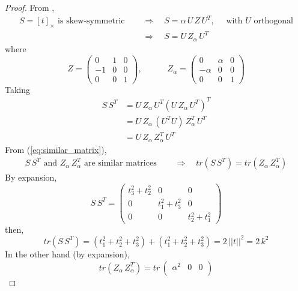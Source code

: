 \begin{proof}
From \cite[Result A4.1 (ii)]{HZ2},
\begin{align*}
S=[t]_{\times} \mbox{ is skew-symmetric } & \quad\Rightarrow\quad S = \alpha\,U\,Z\,U^T, \quad \mbox{ with $U$ orthogonal} \\
        &  \quad\Rightarrow\quad  S = U\,Z_{\alpha}\,U^T
\end{align*}
where
\begin{equation}
Z =
\begin{pmatrix}
  0 & 1  & 0 \\
 -1 &  0  & 0 \\
  0 &  0  & 1
\end{pmatrix}, \quad\quad\quad
Z_{\alpha} =
\begin{pmatrix}
  0 & \alpha  & 0 \\
 -\alpha &  0  & 0 \\
  0 &  0  & 1
\end{pmatrix}
\end{equation}
Taking
\begin{align}
S\,S^T & = U\,Z_{\alpha}\,U^T (U\,Z_{\alpha}\,U^T)^T \nonumber \\
       & = U\,Z_{\alpha}\,(U^T U)\,Z_{\alpha}^T\,U^T \nonumber \\
       & = U\,Z_{\alpha}\,Z_{\alpha}^T\,U^T \label{eq:similar_matrix}
\end{align}
From (\ref{eq:similar_matrix}),
\begin{align}
S\,S^T \mbox{ and } Z_{\alpha}\,Z_{\alpha}^T \mbox{ are similar matrices } & \quad\Rightarrow\quad tr(S\,S^T) = tr(Z_{\alpha}\,Z_{\alpha}^T) \label{eq:equal_trace}
\end{align}
By expansion,
\begin{equation}
S\,S^T =
\begin{pmatrix}
  t_3^2 + t_2^2 & 0  & 0 \\
  0 &  t_1^2 + t_3^2  & 0 \\
  0 &  0  & t_2^2 + t_1^2
\end{pmatrix}
\end{equation}
then,
\begin{equation}
\label{eq:S_trace}
tr(S\,S^T) = (t_1^2 + t_2^2 + t_3^2) + (t_1^2 + t_2^2 + t_3^2) = 2\,||t||^2 = 2\,k^2
\end{equation}
In the other hand (by expansion),
\begin{equation}
\label{eq:Z_trace}
tr(Z_{\alpha}\,Z_{\alpha}^T) =
tr\,\begin{pmatrix}
  \alpha^2 & 0  & 0 \\

\end{pmatrix}
\end{equation}
\end{proof}

